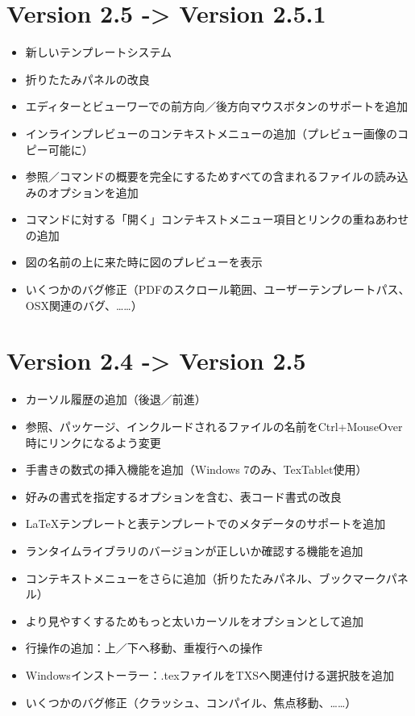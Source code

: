 \section{Version 2.5 -\textgreater{} Version 2.5.1}

\begin{itemize}
\item
  新しいテンプレートシステム
\item
  折りたたみパネルの改良
\item
  エディターとビューワーでの前方向／後方向マウスボタンのサポートを追加
\item
  インラインプレビューのコンテキストメニューの追加（プレビュー画像のコピー可能に）
\item
  参照／コマンドの概要を完全にするためすべての含まれるファイルの読み込みのオプションを追加
\item
  \verb++コマンドに対する「開く」コンテキストメニュー項目とリンクの重ねあわせの追加
\item
  図の名前の上に来た時に図のプレビューを表示
\item
  いくつかのバグ修正（PDFのスクロール範囲、ユーザーテンプレートパス、OSX関連のバグ、……）
\end{itemize}

\section{Version 2.4 -\textgreater{} Version 2.5}

\begin{itemize}
\item
  カーソル履歴の追加（後退／前進）
\item
  参照、パッケージ、インクルードされるファイルの名前をCtrl+MouseOver時にリンクになるよう変更
\item
  手書きの数式の挿入機能を追加（Windows 7のみ、TexTablet使用）
\item
  好みの書式を指定するオプションを含む、表コード書式の改良
\item
  LaTeXテンプレートと表テンプレートでのメタデータのサポートを追加
\item
  ランタイムライブラリのバージョンが正しいか確認する機能を追加
\item
  コンテキストメニューをさらに追加（折りたたみパネル、ブックマークパネル）
\item
  より見やすくするためもっと太いカーソルをオプションとして追加
\item
  行操作の追加：上／下へ移動、重複行への操作
\item
  Windowsインストーラー：.texファイルをTXSへ関連付ける選択肢を追加
\item
  いくつかのバグ修正（クラッシュ、コンパイル、焦点移動、……）
\end{itemize}

